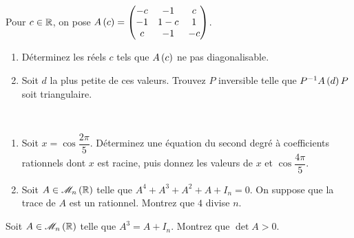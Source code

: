 \begin{corr}
\end{corr}

\begin{exo}~\\
Pour \(c\in\mathbb{R}\), on pose \(A\left(c\right)=\begin{pmatrix}
-c & -1 & c \\
-1 & 1-c & 1 \\
c & -1 & -c
\end{pmatrix}\).

\begin{enumerate}
    \item Déterminez les réels \(c\) tels que \(A\left(c\right)\) ne pas diagonalisable. \\
    \item Soit \(d\) la plus petite de ces valeurs. Trouvez \(P\) inversible telle que \(P^{-1} A\left(d\right)P\) soit triangulaire.
\end{enumerate}
\end{exo}

\begin{corr}
\end{corr}

\begin{exo}~\\
\begin{enumerate}
    \item Soit \(x=\cos\dfrac{2\pi}{5}\). Déterminez une équation du second degré à coefficients rationnels dont \(x\) est racine, puis donnez les valeurs de \(x\) et \(\cos\dfrac{4\pi}{5}\). \\
    \item Soit \(A\in\M{n}[\R]\) telle que \(A^4+A^3+A^2+A+I_n=0\). On suppose que la trace de \(A\) est un rationnel. Montrez que \(4\) divise \(n\).
\end{enumerate}
\end{exo}

\begin{corr}
\end{corr}

\begin{exo}
Soit \(A\in\M{n}[\R]\) telle que \(A^3=A+I_n\). Montrez que \(\det A>0\).
\end{exo}

\begin{corr}
\end{corr}

